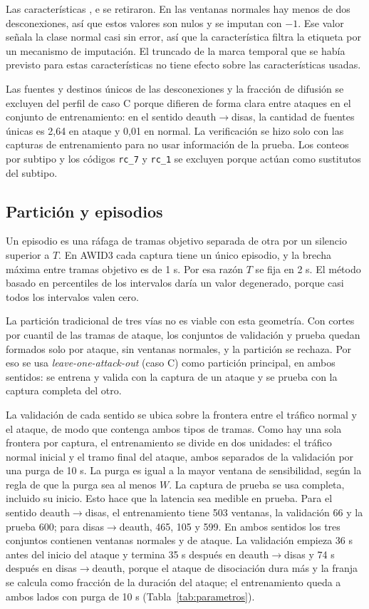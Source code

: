 \documentclass[journal]{IEEEtran}
\begin{document}
Las características ,  e  se retiraron. En las ventanas normales hay menos de dos desconexiones, así que estos valores son nulos y se imputan con $-1$. Ese valor señala la clase normal casi sin error, así que la característica filtra la etiqueta por un mecanismo de imputación. El truncado de la marca temporal que se había previsto para estas características no tiene efecto sobre las características usadas.

Las fuentes y destinos únicos de las desconexiones y la fracción de difusión se excluyen del perfil de caso C porque difieren de forma clara entre ataques en el conjunto de entrenamiento: en el sentido deauth$\rightarrow$disas, la cantidad de fuentes únicas es 2,64 en ataque y 0,01 en normal. La verificación se hizo solo con las capturas de entrenamiento para no usar información de la prueba. Los conteos por subtipo y los códigos \texttt{rc\_7} y \texttt{rc\_1} se excluyen porque actúan como sustitutos del subtipo.

\subsection{Partición y episodios}

Un episodio es una ráfaga de tramas objetivo separada de otra por un silencio superior a $T$. En AWID3 cada captura tiene un único episodio, y la brecha máxima entre tramas objetivo es de 1 s. Por esa razón $T$ se fija en 2 s. El método basado en percentiles de los intervalos daría un valor degenerado, porque casi todos los intervalos valen cero.

La partición tradicional de tres vías no es viable con esta geometría. Con cortes por cuantil de las tramas de ataque, los conjuntos de validación y prueba quedan formados solo por ataque, sin ventanas normales, y la partición se rechaza. Por eso se usa \textit{leave-one-attack-out} (caso C) como partición principal, en ambos sentidos: se entrena y valida con la captura de un ataque y se prueba con la captura completa del otro.

La validación de cada sentido se ubica sobre la frontera entre el tráfico normal y el ataque, de modo que contenga ambos tipos de tramas. Como hay una sola frontera por captura, el entrenamiento se divide en dos unidades: el tráfico normal inicial y el tramo final del ataque, ambos separados de la validación por una purga de 10 s. La purga es igual a la mayor ventana de sensibilidad, según la regla de que la purga sea al menos $W$. La captura de prueba se usa completa, incluido su inicio. Esto hace que la latencia sea medible en prueba. Para el sentido deauth$\rightarrow$disas, el entrenamiento tiene 503 ventanas, la validación 66 y la prueba 600; para disas$\rightarrow$deauth, 465, 105 y 599. En ambos sentidos los tres conjuntos contienen ventanas normales y de ataque. La validación empieza 36 s antes del inicio del ataque y termina 35 s después en deauth$\rightarrow$disas y 74 s después en disas$\rightarrow$deauth, porque el ataque de disociación dura más y la franja se calcula como fracción de la duración del ataque; el entrenamiento queda a ambos lados con purga de 10 s (Tabla~\ref{tab:parametros}).
\end{document}
